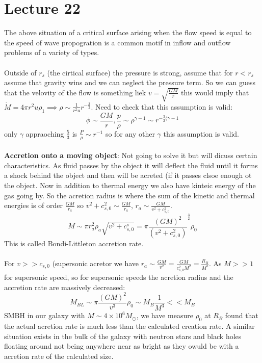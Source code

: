 \documentclass{article}
\begin{document}
\section{Lecture 22}
The above situation of a critical surface arising when the flow speed is equal to the speed of wave propogration is a common motif in inflow and outflow problems of a variety of types.\\\\
Outside of $r_s$ (the cirtical surface) the pressure is strong, assume that for $r< r_s$ assume that gravity wins and we can neglect the pressure term. So we can guess that the velovity of the flow is something liek $v = \sqrt{\frac{GM}{r}} $ this would imply that $\dot M = 4 \pi r^2 u \rho_1 \implies \rho \sim \frac{1}{r^2 u} r^{-\frac{3}{2}}$. Need to check that this assumption is valid:
$$
\phi \sim \frac{GM}{r}, \frac{p}{\rho} \sim \rho^{\gamma-1} \sim r^{-\frac{3}{2}(\gamma -1}
$$
only $\gamma$ appraoching $\frac{5}{3}$ is $\frac{P}{\rho} \sim r^{-1}$ so for any other $\gamma$ this assumption is valid.\\\\
\textbf{Accretion onto a moving object}: Not going to solve it but will dicuss certain characteristics. As fluid passes by the object it will deflect the fluid until it forms a shock behind the object and then will be acreted (if it passes clsoe enough ot the object. Now in addition to thermal energy we also have kinteic energy of the gas going by. So the acretion radius is where the sum of the kinetic and thermal energies is of order $\frac{GM}{r_a}$ so $v^2 + c^2_{s,0} \sim \frac{GM}{r_a}$, $r_a \sim \frac{GM}{v^2 + c^2_{s,0}}$.
        $$
        \dot M \sim \pi r^2_a \rho_a \sqrt{v^2 + c^s_{s,0}} = \pi \frac{(GM)^2}{(v^2 + c_{s,0}^2)}^{\frac{3}{2}} \rho_0
        $$
        This is called Bondi-Littleton accretion rate. \\\\For $v >> c_{s,0}$ (supersonic acretor we have $r_a \sim \frac{GM}{v^2} = \frac{GM}{c_{s,0}^2M^2} = \frac{R_B}{M^2}$. As $M>>1$ for supersonic speed, so for supersonic speeds the acretion radius and the accretion rate are massively decreased:
        $$
        \dot M_{BL} \sim \pi \frac{(GM)^2}{v^3} \rho_0 \sim \dot M_B \frac{1}{M^3} << \dot M_B
        $$
        SMBH in our galaxy with $M \sim 4 \times 10^6 M_{\odot}$, we have measure $\rho_0$ at $R_B$ found that the actual acretion rate is much less than the calculated creation rate. A similar situation exists in the bulk of the galaxy with neutron stars and black holes floating around not being anywhere near  as bright as they owuld be with a acretion rate of the calculated size.
\end{document}
